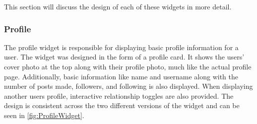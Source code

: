 This section will discuss the design of each of these widgets in more detail.

\subsubsection{Profile}
The profile widget is responsible for displaying basic profile information for a user. The widget was designed in the form of a profile card. It shows the users' cover photo at the top along with their profile photo, much like the actual profile page. Additionally, basic information like name and username along with the number of posts made, followers, and following is also displayed. When displaying another users profile, interactive relationship toggles are also provided. The design is consistent across the two different versions of the widget and can be seen in \ref{fig:ProfileWidget}.

